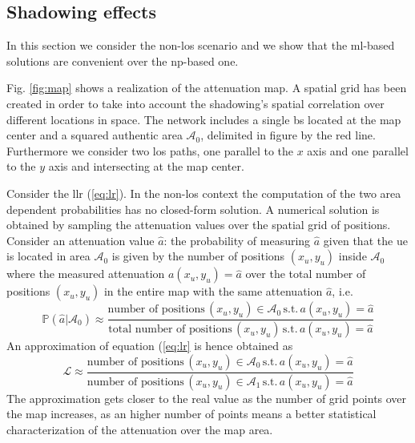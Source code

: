 \documentclass[draftcls,onecolumn,12pt]{IEEEtran}
\begin{document}
\subsection{Shadowing effects}\label{sec:shadow}
In this section we consider the non-\ac{los} scenario and we show that the \ac{ml}-based solutions are convenient over the \ac{np}-based one.

Fig. \ref{fig:map} shows a realization of the attenuation map. A spatial grid has been created in order to take into account the shadowing's spatial correlation over different locations in space. The network includes a single \ac{bs} located at the map center and a squared authentic area $\mathcal{A}_0$, delimited in figure by the red line. Furthermore we consider two \ac{los} paths, one parallel to the $x$ axis and one parallel to the $y$ axis and intersecting at the map center.

Consider the \ac{llr} (\ref{eq:lr}). In the non-\ac{los} context the computation of the two area dependent probabilities has no closed-form solution. A numerical solution is obtained by sampling the attenuation values over the spatial grid of positions. Consider an attenuation value $\hat{a}$: the probability of measuring $\hat{a}$ given that the \ac{ue} is located in area $\mathcal{A}_0$ is given by the number of positions $(x_u,y_u)$ inside $\mathcal{A}_0$ where the measured attenuation $a(x_u,y_u)=\hat{a}$ over the total number of positions $(x_u,y_u)$ in the entire map with the same attenuation $\hat{a}$, i.e.
\begin{equation}
    \mathbb{P}(\hat{a}|\mathcal{A}_0) \approx \frac{\text{number of positions} \, (x_u,y_u) \in \mathcal{A}_0 \, \text{s.t.} \, a(x_u,y_u) = \hat{a}}{\text{total number of positions} \, (x_u,y_u) \, \text{s.t.} \, a(x_u,y_u) = \hat{a}}
\end{equation}
An approximation of equation (\ref{eq:lr} is hence obtained as
\begin{equation}\label{eq:lrApp}
    \mathcal{L} \approx \frac{\text{number of positions} \, (x_u,y_u) \in \mathcal{A}_0 \, \text{s.t.} \, a(x_u,y_u) = \hat{a}}{\text{number of positions} \, (x_u,y_u) \in \mathcal{A}_1 \, \text{s.t.} \, a(x_u,y_u) = \hat{a}}
\end{equation}
The approximation gets closer to the real value as the number of grid points over the map increases, as an higher number of points means a better statistical characterization of the attenuation over the map area.
\end{document}
